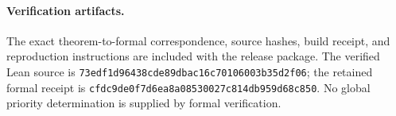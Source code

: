 \documentclass[11pt]{article}
\theoremstyle{definition}
\theoremstyle{remark}
\newcommand{\code}[1]{{\small\nolinkurl{#1}}}
\begin{document}
\paragraph{Verification artifacts.}
The exact theorem-to-formal correspondence, source hashes, build receipt, and reproduction instructions are included with the release package. The verified Lean source is \code{73edf1d96438cde89dbac16c70106003b35d2f06}; the retained formal receipt is \code{cfdc9de0f7d6ea8a08530027c814db959d68c850}. No global priority determination is supplied by formal verification.



\end{document}
